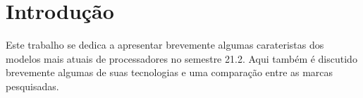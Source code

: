 \chapter{Introdução}


Este trabalho se dedica a apresentar brevemente algumas carateristas dos modelos mais atuais de processadores no semestre 21.2. Aqui também é discutido brevemente algumas de suas tecnologias e uma comparação entre as marcas pesquisadas.